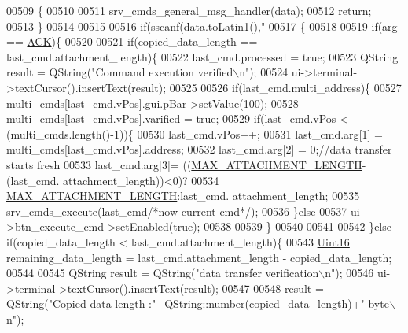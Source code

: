 \begin{DoxyCode}
{{{{{{{{{{{{{{{{{00509         \{
00510 
00511             srv\_cmds\_general\_msg\_handler(data);
00512             \textcolor{keywordflow}{return};
00513         \}
00514 
00515 
00516         \textcolor{keywordflow}{if}(sscanf(data.toLatin1(),\textcolor{stringliteral}{"%
00517         \{
00518 
00519            \textcolor{keywordflow}{if}(arg == \hyperlink{a00090_a6f6489887e08bff4887d0bc5dcf214d8}{ACK})\{
00520 
00521                \textcolor{keywordflow}{if}(copied\_data\_length == last\_cmd.attachment\_length)\{
00522                    last\_cmd.processed = \textcolor{keyword}{true};
00523                    QString result =  QString(\textcolor{stringliteral}{"Command execution verified\(\backslash\)n"});
00524                    ui->terminal->textCursor().insertText(result);
00525 
00526                    \textcolor{keywordflow}{if}(last\_cmd.multi\_address)\{
00527                         multi\_cmds[last\_cmd.vPos].gui.pBar->setValue(100);
00528                         multi\_cmds[last\_cmd.vPos].varified = \textcolor{keyword}{true};
00529                     \textcolor{keywordflow}{if}(last\_cmd.vPos < (multi\_cmds.length()-1))\{
00530                        last\_cmd.vPos++;
00531                        last\_cmd.arg[1] = multi\_cmds[last\_cmd.vPos].address;
00532                        last\_cmd.arg[2] = 0;\textcolor{comment}{//data transfer starts fresh}
00533                        last\_cmd.arg[3]= ((\hyperlink{a00086_aa8abe3a822c64813f7aaba3ca7e3db9c}{MAX\_ATTACHMENT\_LENGTH}-(last\_cmd.
      attachment\_length))<0)?
00534                                           \hyperlink{a00086_aa8abe3a822c64813f7aaba3ca7e3db9c}{MAX\_ATTACHMENT\_LENGTH}:last\_cmd.
      attachment\_length;
00535                        srv\_cmds\_execute(last\_cmd\textcolor{comment}{/*now current cmd*/});
00536                    \}\textcolor{keywordflow}{else}
00537                        ui->btn\_execute\_cmd->setEnabled(\textcolor{keyword}{true});
00538 
00539                    \}
00540 
00541 
00542                \}\textcolor{keywordflow}{else} \textcolor{keywordflow}{if}(copied\_data\_length < last\_cmd.attachment\_length)\{
00543                    \hyperlink{a00004_aae7407b021d43f7193a81a58cfb3e297}{Uint16} remaining\_data\_length = last\_cmd.attachment\_length - copied\_data\_length;
00544 
00545                    QString result =  QString(\textcolor{stringliteral}{"data transfer verification\(\backslash\)n"});
00546                    ui->terminal->textCursor().insertText(result);
00547 
00548                    result =  QString(\textcolor{stringliteral}{"Copied data length :"}+QString::number(copied\_data\_length)+\textcolor{stringliteral}{" byte\(\backslash\)n"});
}}}}}}}}}}}}}}}}}}
\end{DoxyCode}
